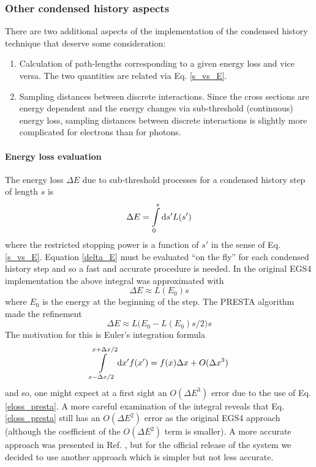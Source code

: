 \subsubsection{Other condensed history aspects}
\label{ch_others}
\setcounter{equation}{0}

There are two additional aspects of the implementation
of the condensed history technique that deserve some
consideration:
\begin{enumerate}
\item
Calculation of path-lengths corresponding to a given
energy loss and vice versa. The two quantities are
related via Eq. \eqref{s_vs_E}.
\item
Sampling distances between discrete interactions.
Since the cross sections are energy dependent and
the energy changes via sub-threshold (continuous) energy loss,
sampling distances between discrete interactions is slightly
more complicated for electrons than for photons.
\end{enumerate}

\paragraph{Energy loss evaluation} \hfill
{}

The energy loss $\Delta E$ due
to sub-threshold processes for
a condensed history step of length $s$ is
\begin{equation}
\label{delta_E}
\Delta E = \int\limits_0^s {\rm d}s' L(s')
\end{equation}
where the restricted stopping power is a function of $s'$
in the sense of Eq. \eqref{s_vs_E}.
Equation \eqref{delta_E} must be evaluated ``on the fly'' for
each condensed history step and so a fast and accurate
procedure is needed.
In the original
EGS4 implementation the above integral was approximated with
\begin{equation}
\Delta E \approx L(E_0) s
\end{equation}
where $E_0$ is the energy at the beginning of the step.
The PRESTA algorithm made the refinement
\begin{equation}
\label{eloss_presta}
\Delta E \approx L\Big(E_0 - L(E_0) s/2\Big) s
\end{equation}
The motivation for this is Euler's integration formula
\begin{equation}
\int\limits_{x - \Delta x/2}^{x + \Delta x/2} {\rm d}x' f(x')
= f(x) \Delta x + O(\Delta x^3)
\end{equation}
and so, one might expect at a first sight an $O(\Delta E^3)$ error due to
the use of Eq. \eqref{eloss_presta}. A more careful examination
of the integral reveals that Eq. \eqref{eloss_presta} still has
an $O(\Delta E^2)$ error as the original EGS4 approach (although
the coefficient of the $O(\Delta E^2)$ term is smaller).
A more accurate approach was
presented in Ref. \cite{Ka99a}, but for the official release of the
system we decided to use another approach which is simpler
but not less accurate.

